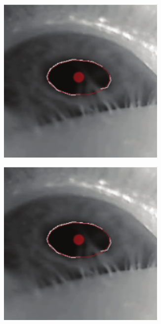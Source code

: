 \documentclass[USenglish,twocolumn]{article}
\begin{document}
\begin{figure}[H]
	\captionsetup[subfigure]{justification=centering}
	\centering
	\begin{subfigure}[b]{0.45\textwidth}
		\centering
		\includegraphics[width=0.9\textwidth]{img/PupilLab/6.png}
		\caption{}
		\label{fig:crossCorrelation1}
	\end{subfigure}
	
	\begin{subfigure}[b]{0.45\textwidth}
		\centering
		\includegraphics[width=0.9\textwidth]{img/PupilLab/6.png}
		\caption{}
		\label{fig:crossCorrelation2}
	\end{subfigure}
	

\end{figure}
\end{document}
